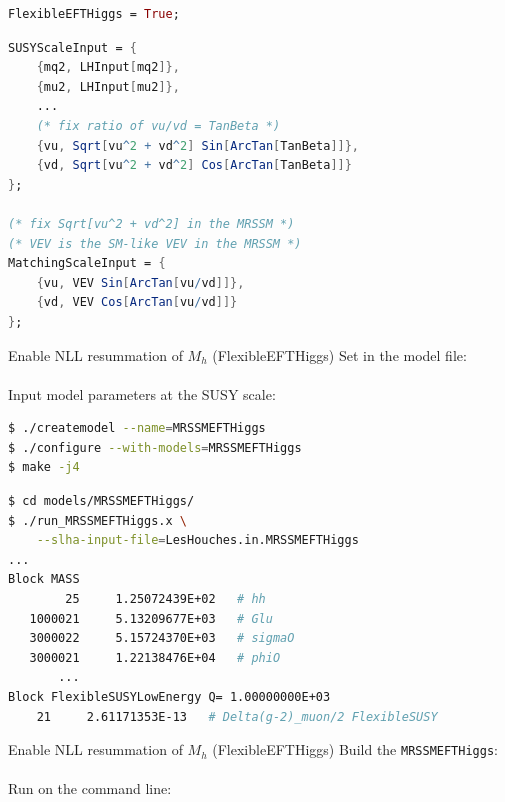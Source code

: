 \documentclass[hyperref={pdfpagelabels=false},ngerman]{beamer}
\begin{document}
\begin{lrbox}{\listbox}\begin{lstlisting}[language=Mathematica]
FlexibleEFTHiggs = True;
\end{lstlisting}\end{lrbox} %

\begin{lrbox}{\listboxt}\begin{lstlisting}[language=Mathematica]
SUSYScaleInput = {
    {mq2, LHInput[mq2]},
    {mu2, LHInput[mu2]},
    ...
    (* fix ratio of vu/vd = TanBeta *)
    {vu, Sqrt[vu^2 + vd^2] Sin[ArcTan[TanBeta]]},
    {vd, Sqrt[vu^2 + vd^2] Cos[ArcTan[TanBeta]]}
};

(* fix Sqrt[vu^2 + vd^2] in the MRSSM *)
(* VEV is the SM-like VEV in the MRSSM *)
MatchingScaleInput = {
    {vu, VEV Sin[ArcTan[vu/vd]]},
    {vd, VEV Cos[ArcTan[vu/vd]]}
};
\end{lstlisting}\end{lrbox} %

\begin{frame}{Enable NLL resummation of $M_h$ (FlexibleEFTHiggs)}
  Set in the model file:\\[1em]
  \usebox{\listbox}
  \\[1em]
  Input model parameters at the SUSY scale:
  \\[1.5em]
  \usebox{\listboxt}
\end{frame}

\begin{lrbox}{\listbox}\begin{lstlisting}[language=bash]
$ ./createmodel --name=MRSSMEFTHiggs
$ ./configure --with-models=MRSSMEFTHiggs
$ make -j4
\end{lstlisting}\end{lrbox} %

\begin{lrbox}{\listboxt}\begin{lstlisting}[language=bash]
$ cd models/MRSSMEFTHiggs/
$ ./run_MRSSMEFTHiggs.x \
    --slha-input-file=LesHouches.in.MRSSMEFTHiggs
...
Block MASS
        25     1.25072439E+02   # hh
   1000021     5.13209677E+03   # Glu
   3000022     5.15724370E+03   # sigmaO
   3000021     1.22138476E+04   # phiO
       ...
Block FlexibleSUSYLowEnergy Q= 1.00000000E+03
    21     2.61171353E-13   # Delta(g-2)_muon/2 FlexibleSUSY
\end{lstlisting}\end{lrbox} %

\begin{frame}{Enable NLL resummation of $M_h$ (FlexibleEFTHiggs)}
  Build the \texttt{MRSSMEFTHiggs}:\\[1.5em]
  \usebox{\listbox}
  \\[1em]
  Run on the command line:
  \\[1.5em]
  \usebox{\listboxt}
\end{frame}
\end{document}
